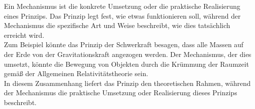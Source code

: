 Ein Mechanismus ist die konkrete Umsetzung oder die praktische Realisierung eines Prinzips. Das Prinzip legt fest, wie etwas funktionieren soll, während der Mechanismus die spezifische Art und Weise beschreibt, wie dies tatsächlich erreicht wird.\\

Zum Beispiel könnte das Prinzip der Schwerkraft besagen, dass alle Massen auf der Erde von der Gravitationskraft angezogen werden. Der Mechanismus, der dies umsetzt, könnte die Bewegung von Objekten durch die Krümmung der Raumzeit gemäß der Allgemeinen Relativitätstheorie sein.\\

In diesem Zusammenhang liefert das Prinzip den theoretischen Rahmen, während der Mechanismus die praktische Umsetzung oder Realisierung dieses Prinzips beschreibt.




